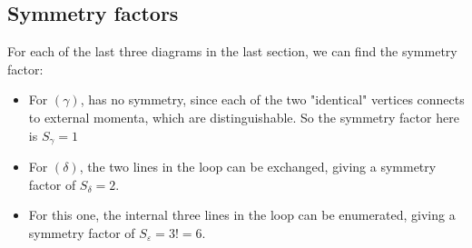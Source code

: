 \documentclass{article}
\begin{document}
\subsection{Symmetry factors}
For each of the last three diagrams in the last section, we can find the symmetry factor:
\begin{itemize}
    \item For $(\gamma)$, has no symmetry, since each of the two "identical" vertices connects to external momenta, which are distinguishable. So the symmetry factor here is $S_\gamma = 1$
    \item For $(\delta)$, the two lines in the loop can be exchanged, giving a symmetry factor of $S_\delta = 2$.
    \item For this one, the internal three lines in the loop can be enumerated, giving a symmetry factor of $S_\varepsilon = 3! = 6$.
\end{itemize}
\end{document}
